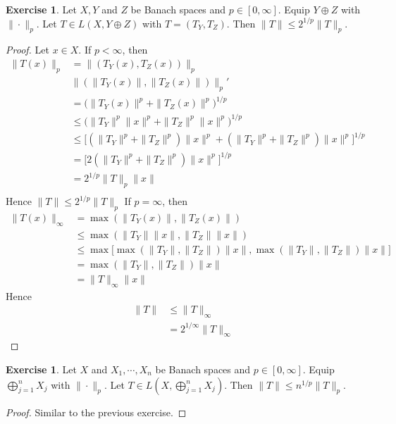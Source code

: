 \documentclass[12pt]{amsart}
\theoremstyle{definition}
\newtheorem{ex}[definition]{Exercise}
\begin{document}
	
	\begin{ex}
	Let $X, Y$ and $Z$ be Banach spaces and $p \in [0, \infty]$. Equip $Y \oplus Z$ with $\|\cdot\|_p$. Let $T \in L(X, Y \oplus Z)$ with $T = (T_Y, T_Z)$. Then $\|T\|\leq 2^{1/p}\|T\|_p$.
	\end{ex}
	
	\begin{proof}
	Let $x \in X$. If $p < \infty$, then
	\begin{align*}
	\|T(x)\|_p
	&= \|(T_Y(x), T_Z(x))\|_p \\
	& \|( \|T_Y(x)\|, \|T_Z(x)\|)\|_p' \\
	&=  \bigg(\|T_Y(x) \|^p +  \|T_Z(x) \|^p \bigg)^{1/p} \\
	& \leq \bigg(\|T_Y\|^p\|x\|^p +  \|T_Z\|^p\|x\|^p \bigg)^{1/p} \\
	& \leq \bigg[ (\|T_Y\|^p+ \|T_Z\|^p)\|x\|^p +  (\|T_Y\|^p + \|T_Z\|^p)\|x\|^p \bigg ]^{1/p} \\
	&= \bigg[ 2(\|T_Y\|^p + \|T_Z\|^p)\|x\|^p \bigg ]^{1/p} \\
	&= 2^{1/p}\|T\|_p\|x\| \\
	\end{align*}
	Hence $\|T\| \leq 2^{1/p}\|T\|_p$
	If $p = \infty$, then 
	\begin{align*}
	\|T(x)\|_{\infty} 
	&= \max(\|T_Y(x) \|, \|T_Z(x)\|) \\
	& \leq \max(\|T_Y\|\|x \|, \|T_Z\|\|x\|) \\
	& \leq \max \bigg[ \max (\|T_Y\|, \|T_Z\|)\|x \|, \max(\|T_Y\| ,\|T_Z\|)\|x\| \bigg] \\
	&= \max(\|T_Y\| ,\|T_Z\|) \|x\|\\
	&= \|T\|_{\infty} \|x\|
	\end{align*}
	Hence 
	\begin{align*}
	\|T\| 
	& \leq \|T\|_{\infty} \\
	&= 2^{1/\infty}\|T\|_{\infty}
	\end{align*}
	\end{proof}
	
	\begin{ex}
	Let $X$ and $X_1, \cdots, X_n$ be Banach spaces and $p \in [0, \infty]$. Equip $\bigoplus\limits_{j=1}^n X_j$ with $\|\cdot\|_p$. Let $T \in L(X, \bigoplus\limits_{j=1}^n X_j)$. Then $\|T\|\leq n^{1/p}\|T\|_p$.
	\end{ex}
	
	\begin{proof}
	Similar to the previous exercise.
	\end{proof}
	
\end{document}
